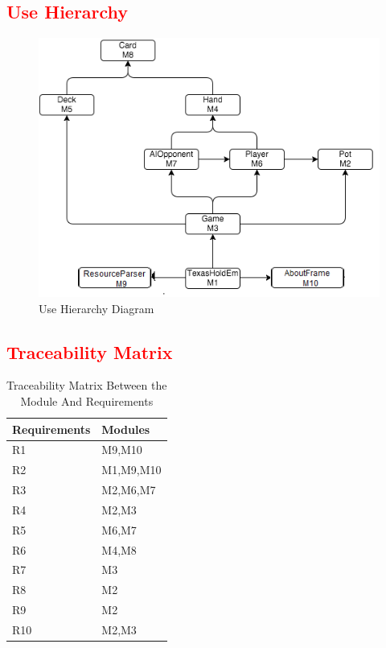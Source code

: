\documentclass[11pt]{article}
\begin{document}
   \textcolor{red}{ \section{Use Hierarchy}}
    \begin{figure}[h]
		\includegraphics[scale=0.7]{Uses.png}
		\caption{Use Hierarchy Diagram}
		\label{fig1: Figure1}
		\end{figure}
	\newpage
    \textcolor{red}{\section{Traceability Matrix}}
    \begin{table}[h]
    \caption{Traceability Matrix Between the Module And Requirements}
    \begin{tabular}{p{4cm}p{2cm}}
    Requirements & Modules\\
    \hline
    R1 & M9,M10\\
    \hline
    R2 & M1,M9,M10\\
    \hline
    R3 & M2,M6,M7\\
    \hline
    R4 & M2,M3\\
    \hline
    R5 & M6,M7\\
    \hline
    R6 & M4,M8\\
    \hline
    R7 & M3\\
    \hline
    R8 & M2\\
    \hline
    R9 & M2\\
    \hline
    R10 & M2,M3\\
    \hline
    \end{tabular}
    \end{table}
    
\end{document}
